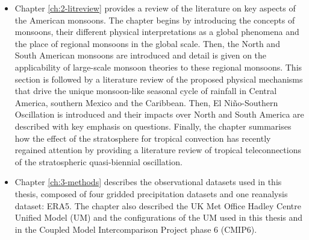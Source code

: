 \begin{itemize}
\item Chapter \ref{ch:2-litreview} provides a review of the literature on key aspects of the American monsoons. The chapter begins by introducing the concepts of monsoons, their different physical interpretations as a global phenomena and the place of regional monsoons in the global scale. Then, the North and South American monsoons are introduced and detail is given on the applicability of large-scale monsoon theories to these regional monsoons. This section is followed by a literature review of the proposed physical mechanisms that drive the unique monsoon-like seasonal cycle of rainfall in Central America, southern Mexico and the Caribbean. Then, El Niño-Southern Oscillation is introduced and their impacts over North and South America are described with key emphasis on questions. Finally, the chapter summarises how the effect of the stratosphere for tropical convection has recently regained attention by providing a literature review of tropical teleconnections of the stratospheric quasi-biennial oscillation. 

\item  Chapter \ref{ch:3-methods} describes the observational datasets used in this thesis, composed of four gridded precipitation datasets and one reanalysis dataset: ERA5. The chapter also described the UK Met Office Hadley Centre Unified Model (UM) and the configurations of the UM used in this thesis and in the Coupled Model Intercomparison Project phase 6 (CMIP6). 


\end{itemize}
